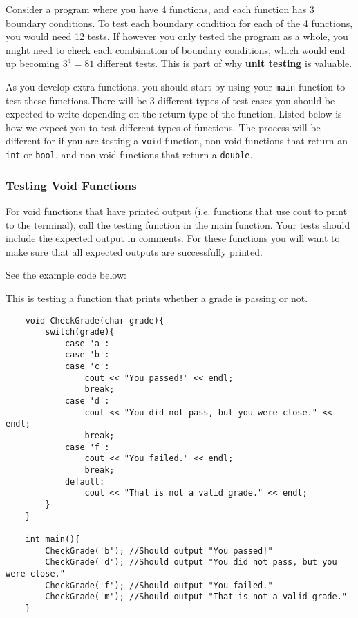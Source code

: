 Consider a program where you have 4 functions, and each function has 3 boundary conditions. To test each boundary condition for each of the 4 functions, you would need 12 tests. If however you only tested the program as a whole, you might need to check each combination of boundary conditions, which would end up becoming $3^4 = 81$ different tests. This is part of why \textbf{unit testing} is valuable. 

As you develop extra functions, you should start by using your \texttt{main} function to test these functions.There will be 3 different types of test cases you should be expected to write depending on the return type of the function. Listed below is how we expect you to test different types of functions. The process will be different for if you are testing a \texttt{void} function, non-void functions that return an \texttt{int} or \texttt{bool}, and non-void functions that return a \texttt{double}.

\subsubsection{Testing Void Functions}

For void functions that have printed output (i.e. functions that use cout to print to the terminal), call the testing function in the main function. Your tests should include the expected output in comments. For these functions you will want to make sure that all expected outputs are successfully printed.

See the example code below:

\begin{example}
    This is testing a function that prints whether a grade is passing or not. 
    \begin{verbatim}
    void CheckGrade(char grade){
        switch(grade){
            case 'a':
            case 'b':
            case 'c':
                cout << "You passed!" << endl;
                break;
            case 'd':
                cout << "You did not pass, but you were close." << endl;
                break;
            case 'f':
                cout << "You failed." << endl;
                break;
            default:
                cout << "That is not a valid grade." << endl;
        }
    }        

    int main(){
        CheckGrade('b'); //Should output "You passed!"
        CheckGrade('d'); //Should output "You did not pass, but you were close."
        CheckGrade('f'); //Should output "You failed."
        CheckGrade('m'); //Should output "That is not a valid grade."
    }
    \end{verbatim}

\end{example}

